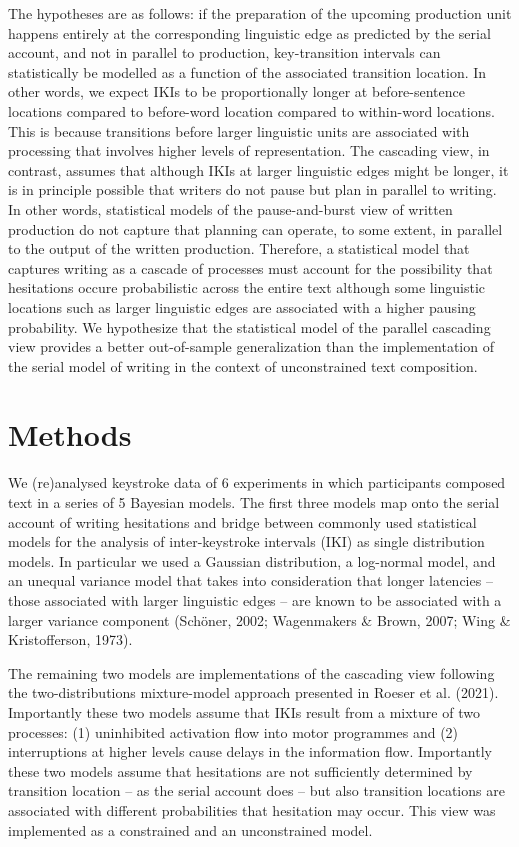 \documentclass[
  english,
  man,floatsintext]{apa7}
\begin{document}
The hypotheses are as follows: if the preparation of the upcoming production unit happens entirely at the corresponding linguistic edge as predicted by the serial account, and not in parallel to production, key-transition intervals can statistically be modelled as a function of the associated transition location. In other words, we expect IKIs to be proportionally longer at before-sentence locations compared to before-word location compared to within-word locations. This is because transitions before larger linguistic units are associated with processing that involves higher levels of representation. The cascading view, in contrast, assumes that although IKIs at larger linguistic edges might be longer, it is in principle possible that writers do not pause but plan in parallel to writing. In other words, statistical models of the pause-and-burst view of written production do not capture that planning can operate, to some extent, in parallel to the output of the written production. Therefore, a statistical model that captures writing as a cascade of processes must account for the possibility that hesitations occure probabilistic across the entire text although some linguistic locations such as larger linguistic edges are associated with a higher pausing probability. We hypothesize that the statistical model of the parallel cascading view provides a better out-of-sample generalization than the implementation of the serial model of writing in the context of unconstrained text composition.

\hypertarget{methods}{%
\section{Methods}\label{methods}}

We (re)analysed keystroke data of 6 experiments in which participants composed text in a series of 5 Bayesian models. The first three models map onto the serial account of writing hesitations and bridge between commonly used statistical models for the analysis of inter-keystroke intervals (IKI) as single distribution models. In particular we used a Gaussian distribution, a log-normal model, and an unequal variance model that takes into consideration that longer latencies -- those associated with larger linguistic edges -- are known to be associated with a larger variance component (Schöner, 2002; Wagenmakers \& Brown, 2007; Wing \& Kristofferson, 1973).

The remaining two models are implementations of the cascading view following the two-distributions mixture-model approach presented in Roeser et al. (2021). Importantly these two models assume that IKIs result from a mixture of two processes: (1) uninhibited activation flow into motor programmes and (2) interruptions at higher levels cause delays in the information flow. Importantly these two models assume that hesitations are not sufficiently determined by transition location -- as the serial account does -- but also transition locations are associated with different probabilities that hesitation may occur. This view was implemented as a constrained and an unconstrained model.
\end{document}
